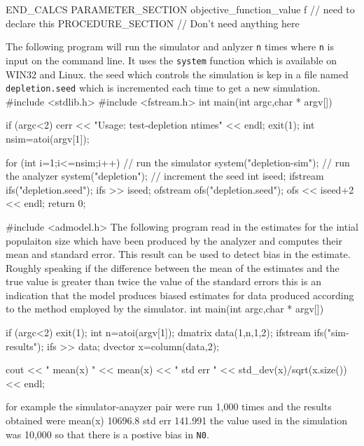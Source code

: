  END_CALCS
PARAMETER_SECTION
  objective_function_value f // need to declare this
PROCEDURE_SECTION
  // Don't need anything here
\endexample

The following program will run the simulator and anlyzer {\tt n}
times where {\tt n} is input on the command line.
It uses the {\tt system} function which is available
on WIN32 and Linux. the seed which controls the simulation is kep in a file
named {\tt depletion.seed} which is incremented each time to get
a new simulation.
\beginexample
#include <stdlib.h>
#include <fstream.h>
int main(int argc,char * argv[])
{
  if (argc<2)
  {
    cerr << "Usage: test-depletion ntimes" << endl;
    exit(1);
  }
  int nsim=atoi(argv[1]); 

  for (int i=1;i<=nsim;i++)
  {
    // run the simulator
    system("depletion-sim");
    // run the analyzer
    system("depletion");
    // increment the seed
    int iseed;
    {
      ifstream ifs("depletion.seed");
      ifs >> iseed;
    }
    {
      ofstream ofs("depletion.seed");
      ofs << iseed+2 << endl;
    }
  }
  return 0;
}
\endexample
{}
\beginexample
#include <admodel.h>
The following program read in the estimates for the intial populaiton
size which have been produced by the analyzer and computes their
mean and standard error. This result can be used to detect bias
in the estimate. Roughly speaking if the difference between the mean of the estimates
and the true value is greater than twice the value of the standard errors this
is an indication that the model produces biased estimates for data produced
according to the method employed by the simulator.
int main(int argc,char * argv[])
{
  if (argc<2) exit(1);
  int n=atoi(argv[1]);
  dmatrix data(1,n,1,2);
  ifstream ifs("sim-results");
  ifs >> data;
  dvector x=column(data,2);

  cout << " mean(x) " << mean(x) << "  std err " << std_dev(x)/sqrt(x.size()) << endl;
} 
\endexample
for example the simulator-anayzer pair were run 1,000 times and the results
obtained were
\beginexample
 mean(x) 10696.8  std err 141.991
\endexample
the value used in the simulation was 10,000
so that there is a postive bias in {\tt N0}.  





